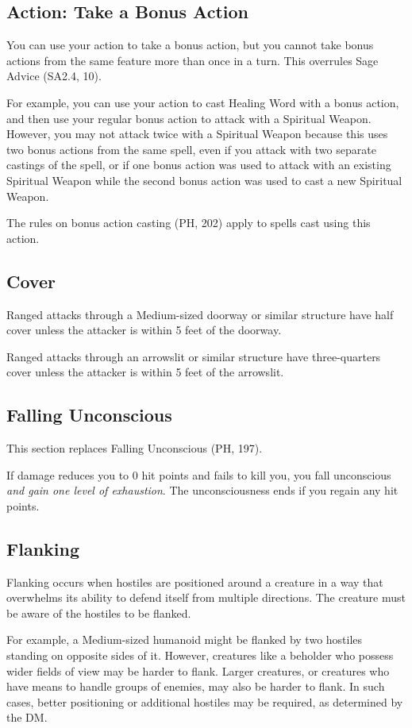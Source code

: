 \documentclass[letterpaper,twocolumn,openany,nodeprecatedcode]{dndbook}
\begin{document}
\subsection{Action: Take a Bonus Action}
\label{takeABonusAction}
You can use your action to take a bonus action, but you cannot take bonus actions from the same feature more than once in a turn. This overrules Sage Advice (SA2.4, 10).

For example, you can use your action to cast Healing Word with a bonus action, and then use your regular bonus action to attack with a Spiritual Weapon. However, you may not attack twice with a Spiritual Weapon because this uses two bonus actions from the same spell, even if you attack with two separate castings of the spell, or if one bonus action was used to attack with an existing Spiritual Weapon while the second bonus action was used to cast a new Spiritual Weapon.

The rules on bonus action casting (PH, 202) apply to spells cast using this action.

\subsection{Cover}
Ranged attacks through a Medium-sized doorway or similar structure have half cover unless the attacker is within 5 feet of the doorway.

Ranged attacks through an arrowslit or similar structure have three-quarters cover unless the attacker is within 5 feet of the arrowslit.

\subsection{Falling Unconscious}
This section replaces Falling Unconscious (PH, 197).

If damage reduces you to 0 hit points and fails to kill you, you fall unconscious \textit{and gain one level of exhaustion}. The unconsciousness ends if you regain any hit points.

\subsection{Flanking}
Flanking occurs when hostiles are positioned around a creature in a way that overwhelms its ability to defend itself from multiple directions. The creature must be aware of the hostiles to be flanked.

For example, a Medium-sized humanoid might be flanked by two hostiles standing on opposite sides of it. However, creatures like a beholder who possess wider fields of view may be harder to flank. Larger creatures, or creatures who have means to handle groups of enemies, may also be harder to flank. In such cases, better positioning or additional hostiles may be required, as determined by the DM.
\end{document}
